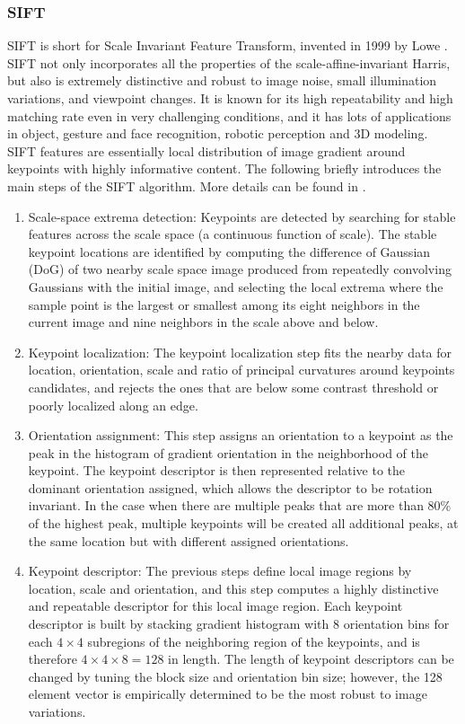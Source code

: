 \documentclass[twoside]{article}
\begin{document}
\subsubsection{SIFT}
SIFT is short for Scale Invariant Feature Transform, invented in 1999 by Lowe \cite{SIFT}. SIFT not only incorporates all the properties of the scale-affine-invariant Harris, but also is extremely distinctive and robust to image noise, small illumination variations, and viewpoint changes. It is known for its high repeatability and high matching rate even in very challenging conditions, and it has lots of applications in object, gesture and face recognition, robotic perception and 3D modeling. SIFT features are essentially local distribution of image gradient around keypoints with highly informative content. The following briefly introduces the main steps of the SIFT algorithm. More details can be found in \cite{SIFT}.
\begin{enumerate}
\item Scale-space extrema detection: Keypoints are detected by searching for stable features across the scale space (a continuous function of scale). The stable keypoint locations are identified by computing the difference of Gaussian (DoG) of two nearby scale space image produced from repeatedly convolving Gaussians with the initial image, and selecting the local extrema where the sample point is the largest or smallest among its eight neighbors in the current image and nine neighbors in the scale above and below. 
\item Keypoint localization: The keypoint localization step fits the nearby data for location, orientation, scale and ratio of principal curvatures around keypoints candidates, and rejects the ones that are below some contrast threshold or poorly localized along an edge. 
\item Orientation assignment: This step assigns an orientation to a keypoint as the peak in the histogram of gradient orientation in the neighborhood of the keypoint. The keypoint descriptor is then represented relative to the dominant orientation assigned, which allows the descriptor to be rotation invariant. In the case when there are multiple peaks that are more than 80\% of the highest peak, multiple keypoints will be created all additional peaks, at the same location but with different assigned orientations. 
\item Keypoint descriptor: The previous steps define local image regions by location, scale and orientation, and this step computes a highly distinctive and repeatable descriptor for this local image region. Each keypoint descriptor is built by stacking gradient histogram with 8 orientation bins for each $4\times 4 $ subregions of the neighboring region of the keypoints, and is therefore $4\times 4 \times 8 = 128$ in length. The length of keypoint descriptors can be changed by tuning the block size and orientation bin size; however, the 128 element vector is empirically determined to be the most robust to image variations. 

\end{enumerate}


\end{document}
